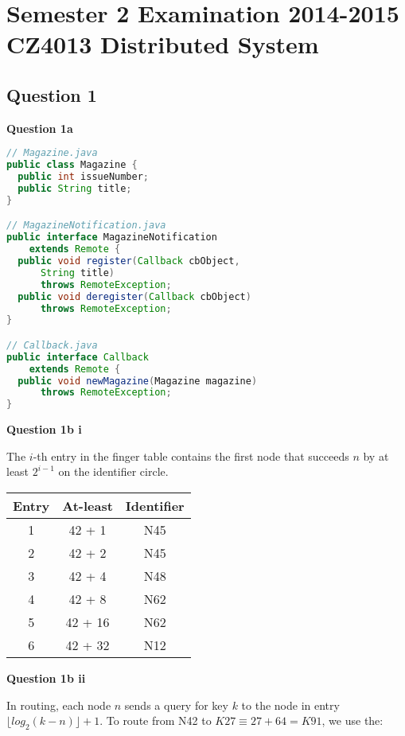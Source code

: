 \documentclass[11pt,a4paper]{report}
\begin{document}
\chapter{Semester 2 Examination 2014-2015\\CZ4013 Distributed System}

\begin{multicols*}{2}

\section{Question 1}

\noindent \textbf{Question 1a}
\footnotesize
\begin{lstlisting}[language=Java]
// Magazine.java
public class Magazine {
  public int issueNumber;
  public String title;
}

// MagazineNotification.java
public interface MagazineNotification
    extends Remote {
  public void register(Callback cbObject,
      String title)
      throws RemoteException;
  public void deregister(Callback cbObject)
      throws RemoteException;
}

// Callback.java
public interface Callback
    extends Remote {
  public void newMagazine(Magazine magazine)
      throws RemoteException;
}
\end{lstlisting}
\normalsize

\noindent \textbf{Question 1b i}

\noindent The $i$-th entry in the finger table contains the first node that succeeds $n$ by at least $2^{i-1}$ on the identifier circle.

\begin{center}
\begin{tabular}{|c|c|c|}
  \hline
  Entry & At-least & Identifier \\ \hline
  1     & 42 + 1   & N45        \\
  2     & 42 + 2   & N45        \\
  3     & 42 + 4   & N48        \\
  4     & 42 + 8   & N62        \\
  5     & 42 + 16  & N62        \\
  6     & 42 + 32  & N12        \\ \hline
\end{tabular}
\end{center}

\noindent \textbf{Question 1b ii}

\noindent In routing, each node $n$ sends a query for key $k$ to the node in entry $\lfloor log_2(k-n) \rfloor + 1$. To route from N42 to $K27 \equiv 27 + 64 = K91$, we use the:


\end{multicols*}
\end{document}
